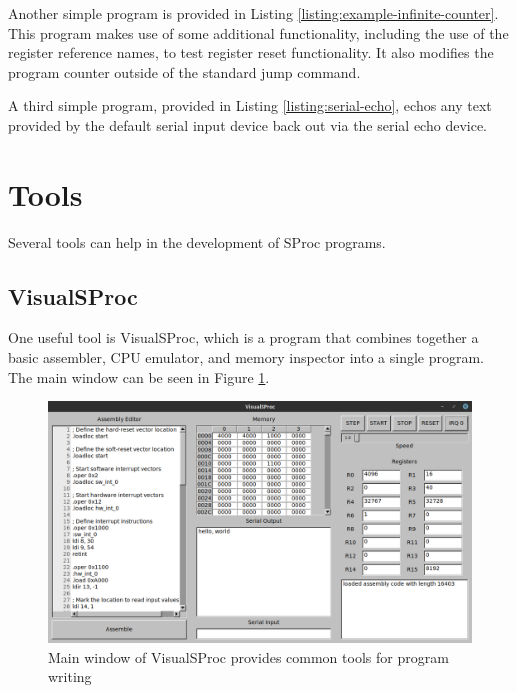 \documentclass{article}
\begin{document}
Another simple program is provided in Listing \ref{listing:example-infinite-counter}. This program makes use of some additional functionality, including the use of the register reference names, to test register reset functionality. It also modifies the program counter outside of the standard jump command.



A third simple program, provided in Listing \ref{listing:serial-echo}, echos any text provided by the default serial input device back out via the serial echo device.



\pagebreak

\section{Tools}

Several tools can help in the development of SProc programs.

\subsection{VisualSProc}

One useful tool is VisualSProc, which is a program that combines together a basic assembler, CPU emulator, and memory inspector into a single program. The main window can be seen in Figure \ref{fig:visual-sproc-main-page}.

\begin{figure}[h!]
	\centering
	\includegraphics[width=5in]{images/visual-sproc.png}
	\caption{Main window of VisualSProc provides common tools for program writing}
	\label{fig:visual-sproc-main-page}
\end{figure}
\end{document}
